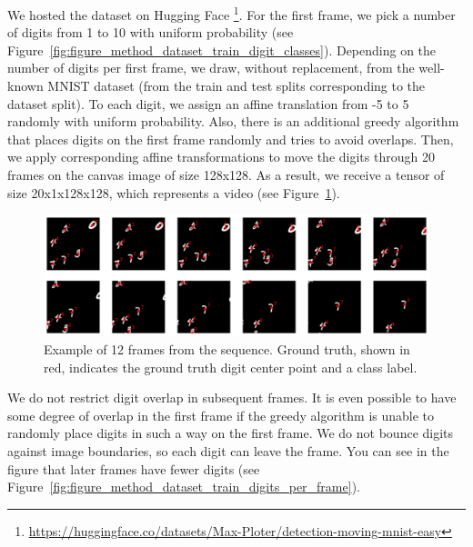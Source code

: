 We hosted the dataset on Hugging Face \footnote{\url{https://huggingface.co/datasets/Max-Ploter/detection-moving-mnist-easy}}. For the first frame, we pick a number of digits from 1 to 10 with uniform probability (see Figure~\ref{fig:figure_method_dataset_train_digit_classes}). Depending on the number of digits per first frame, we draw, without replacement, from the well-known MNIST dataset (from the train and test splits corresponding to the dataset split). To each digit, we assign an affine translation from -5 to 5 randomly with uniform probability. Also, there is an additional greedy algorithm that places digits on the first frame randomly and tries to avoid overlaps. Then, we apply corresponding affine transformations to move the digits through 20 frames on the canvas image of size 128x128. As a result, we receive a tensor of size 20x1x128x128, which represents a video (see Figure~\ref{fig:figure_methods_dataset_detection_mmnist_sequence}).


\begin{figure}
    \centering
    \includegraphics[width=\textwidth]{figures/figure_methods_dataset_detection_mmnist_sequence.png}
    \caption{Example of 12 frames from the sequence. Ground truth, shown in red, indicates the ground truth digit center point and a class label.}
    \label{fig:figure_methods_dataset_detection_mmnist_sequence}
\end{figure}



We do not restrict digit overlap in subsequent frames. It is even possible to have some degree of overlap in the first frame if the greedy algorithm is unable to randomly place digits in such a way on the first frame.
We do not bounce digits against image boundaries, so each digit can leave the frame. You can see in the figure that later frames have fewer digits (see Figure~\ref{fig:figure_method_dataset_train_digits_per_frame}).

